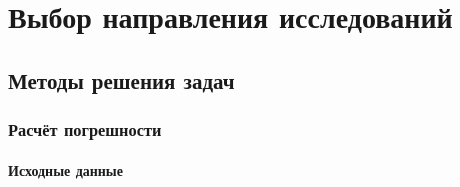\section{Выбор направления исследований}

\subsection{Методы решения задач}

\subsubsection{Расчёт погрешности}

\paragraph{Исходные данные}
